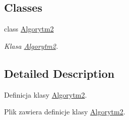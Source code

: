 \subsection*{Classes}
\begin{DoxyCompactItemize}
\item 
class \hyperlink{a00003}{Algorytm2}
\begin{DoxyCompactList}\small\item\em Klasa \hyperlink{a00003}{Algorytm2}. \end{DoxyCompactList}\end{DoxyCompactItemize}


\subsection{Detailed Description}
Definicja klasy \hyperlink{a00003}{Algorytm2}. 

Plik zawiera definicje klasy \hyperlink{a00003}{Algorytm2}. 